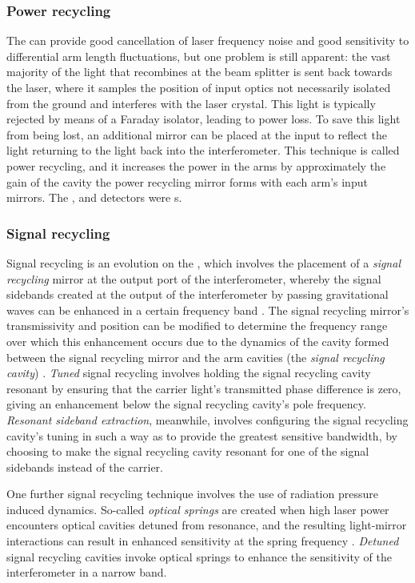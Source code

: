 \subsubsection{\label{sec:power-recycling}Power recycling}
The \FPMI{} can provide good cancellation of laser frequency noise and good sensitivity to differential arm length fluctuations, but one problem is still apparent: the vast majority of the light that recombines at the beam splitter is sent back towards the laser, where it samples the position of input optics not necessarily isolated from the ground and interferes with the laser crystal. This light is typically rejected by means of a Faraday isolator, leading to power loss. To save this light from being lost, an additional mirror can be placed at the input to reflect the light returning to the light back into the interferometer. This technique is called power recycling, and it increases the power in the arms by approximately the gain of the cavity the power recycling mirror forms with each arm's input mirrors. The \ILIGO{}, \IVIRGO{} and \IVIRGO{} detectors were \PRFPMI{}s.

\subsubsection{\label{sec:signal-recycling}Signal recycling}
Signal recycling is an evolution on the \PRFPMI{}, which involves the placement of a \emph{signal recycling} mirror at the output port of the interferometer, whereby the signal sidebands created at the output of the interferometer by passing gravitational waves can be enhanced in a certain frequency band \cite{Meers1988}. The signal recycling mirror's transmissivity and position can be modified to determine the frequency range over which this enhancement occurs due to the dynamics of the cavity formed between the signal recycling mirror and the arm cavities (the \emph{signal recycling cavity}) \cite{Buonanno2001}. \emph{Tuned} signal recycling involves holding the signal recycling cavity resonant by ensuring that the carrier light's transmitted phase difference is zero, giving an enhancement below the signal recycling cavity's pole frequency. \emph{Resonant sideband extraction}, meanwhile, involves configuring the signal recycling cavity's tuning in such a way as to provide the greatest sensitive bandwidth, by choosing to make the signal recycling cavity resonant for one of the signal sidebands instead of the carrier.

One further signal recycling technique involves the use of radiation pressure induced dynamics. So-called \emph{optical springs} are created when high laser power encounters optical cavities detuned from resonance, and the resulting light-mirror interactions can result in enhanced sensitivity at the spring frequency \cite{Buonanno2002}. \emph{Detuned} signal recycling cavities invoke optical springs to enhance the sensitivity of the interferometer in a narrow band.

